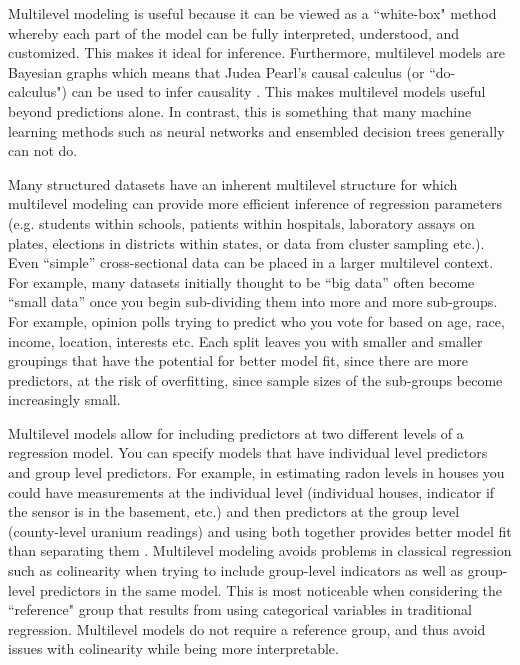 Multilevel modeling is useful because it can be viewed as a ``white-box" method whereby each part of the model can be fully interpreted, understood, and customized. This makes it ideal for inference. Furthermore, multilevel models are Bayesian graphs which means that Judea Pearl’s causal calculus (or ``do-calculus") can be used to infer causality \cite{Pearl2000}. This makes multilevel models useful beyond predictions alone. In contrast, this is something that many machine learning methods such as neural networks and ensembled decision trees generally can not do.

Many structured datasets have an inherent multilevel structure for which multilevel modeling can provide more efficient inference of regression parameters (e.g. students within schools, patients within hospitals, laboratory assays on plates, elections in districts within states, or data from cluster sampling etc.). Even “simple” cross-sectional data can be placed in a larger multilevel context. For example, many datasets initially thought to be ``big data” often become ``small data” once you begin sub-dividing them into more and more sub-groups. For example, opinion polls trying to predict who you vote for based on age, race, income, location, interests etc. Each split leaves you with smaller and smaller groupings that have the potential for better model fit, since there are more predictors, at the risk of overfitting, since sample sizes of the sub-groups become increasingly small.

Multilevel models allow for including predictors at two different levels of a regression model. You can specify models that have individual level predictors and group level predictors. For example, in estimating radon levels in houses you could have measurements at the individual level (individual houses, indicator if the sensor is in the basement, etc.) and then predictors at the group level (county-level uranium readings) and using both together provides better model fit than separating them \cite{Gelman2006b}. Multilevel modeling avoids problems in classical regression such as colinearity when trying to include group-level indicators as well as group-level predictors in the same model. This is most noticeable when considering the ``reference" group that results from using categorical variables in traditional regression. Multilevel models do not require a reference group, and thus avoid issues with colinearity while being more interpretable.

